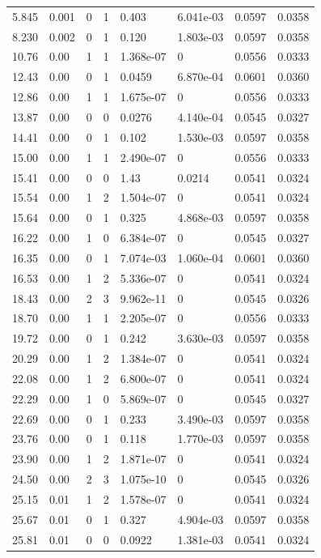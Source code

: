 \documentclass[preview]{standalone}
\begin{document}
{{\begin{tabular}{L{1.2cm}C{1.2cm} C{0.3cm}C{0.5cm} C{1.4cm}C{1.4cm} C{1.4cm}C{1.4cm}}
  5.845  &  0.001  & 0     &  1 &  0.403  & 6.041e-03  & 0.0597 &  0.0358   \\ 
  8.230  &  0.002  & 0     &  1 &  0.120  & 1.803e-03  & 0.0597 &  0.0358   \\ 
  10.76  &  0.00  & 1     &  1 &  1.368e-07  & 0  & 0.0556 &  0.0333   \\ 
  12.43  &  0.00  & 0     &  1 &  0.0459  & 6.870e-04  & 0.0601 &  0.0360   \\ 
  12.86  &  0.00  & 1     &  1 &  1.675e-07  & 0  & 0.0556 &  0.0333   \\ 
  13.87  &  0.00  & 0     &  0 &  0.0276  & 4.140e-04  & 0.0545 &  0.0327   \\ 
  14.41  &  0.00  & 0     &  1 &  0.102  & 1.530e-03  & 0.0597 &  0.0358   \\ 
  15.00  &  0.00  & 1     &  1 &  2.490e-07  & 0  & 0.0556 &  0.0333   \\ 
  15.41  &  0.00  & 0     &  0 &  1.43  & 0.0214  & 0.0541 &  0.0324   \\ 
  15.54  &  0.00  & 1     &  2 &  1.504e-07  & 0  & 0.0541 &  0.0324   \\ 
  15.64  &  0.00  & 0     &  1 &  0.325  & 4.868e-03  & 0.0597 &  0.0358   \\ 
  16.22  &  0.00  & 1     &  0 &  6.384e-07  & 0  & 0.0545 &  0.0327   \\ 
  16.35  &  0.00  & 0     &  1 &  7.074e-03  & 1.060e-04  & 0.0601 &  0.0360   \\ 
  16.53  &  0.00  & 1     &  2 &  5.336e-07  & 0  & 0.0541 &  0.0324   \\ 
  18.43  &  0.00  & 2     &  3 &  9.962e-11  & 0  & 0.0545 &  0.0326   \\ 
  18.70  &  0.00  & 1     &  1 &  2.205e-07  & 0  & 0.0556 &  0.0333   \\ 
  19.72  &  0.00  & 0     &  1 &  0.242  & 3.630e-03  & 0.0597 &  0.0358   \\ 
  20.29  &  0.00  & 1     &  2 &  1.384e-07  & 0  & 0.0541 &  0.0324   \\ 
  22.08  &  0.00  & 1     &  2 &  6.800e-07  & 0  & 0.0541 &  0.0324   \\ 
  22.29  &  0.00  & 1     &  0 &  5.869e-07  & 0  & 0.0545 &  0.0327   \\ 
  22.69  &  0.00  & 0     &  1 &  0.233  & 3.490e-03  & 0.0597 &  0.0358   \\ 
  23.76  &  0.00  & 0     &  1 &  0.118  & 1.770e-03  & 0.0597 &  0.0358   \\ 
  23.90  &  0.00  & 1     &  2 &  1.871e-07  & 0  & 0.0541 &  0.0324   \\ 
  24.50  &  0.00  & 2     &  3 &  1.075e-10  & 0  & 0.0545 &  0.0326   \\ 
  25.15  &  0.01  & 1     &  2 &  1.578e-07  & 0  & 0.0541 &  0.0324   \\ 
  25.67  &  0.01  & 0     &  1 &  0.327  & 4.904e-03  & 0.0597 &  0.0358   \\ 
  25.81  &  0.01  & 0     &  0 &  0.0922  & 1.381e-03  & 0.0541 &  0.0324   \\ 
\hline 
\end{tabular} 

}}
\end{document}

